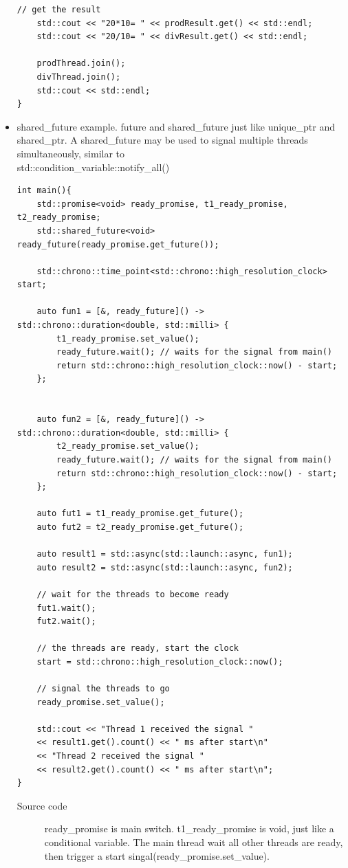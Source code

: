 \documentclass[a4paper,11pt,twoside]{book}
\begin{document}
\begin{itemize}
\begin{lstlisting}[numbers=none]
	// get the result
	std::cout << "20*10= " << prodResult.get() << std::endl;
	std::cout << "20/10= " << divResult.get() << std::endl;
	
	prodThread.join();	
	divThread.join();
	std::cout << std::endl;	
}	
\end{lstlisting}

\item shared\_future example. future and shared\_future just like unique\_ptr and shared\_ptr. A shared\_future may be used to signal multiple threads simultaneously, similar to \\
std::condition\_variable::notify\_all()

\begin{lstlisting}[numbers=none]
int main(){   
	std::promise<void> ready_promise, t1_ready_promise, t2_ready_promise;
	std::shared_future<void> ready_future(ready_promise.get_future());
	
	std::chrono::time_point<std::chrono::high_resolution_clock> start;
	
	auto fun1 = [&, ready_future]() -> std::chrono::duration<double, std::milli> {
		t1_ready_promise.set_value();
		ready_future.wait(); // waits for the signal from main()
		return std::chrono::high_resolution_clock::now() - start;
	};
	
	
	auto fun2 = [&, ready_future]() -> std::chrono::duration<double, std::milli> {
		t2_ready_promise.set_value();
		ready_future.wait(); // waits for the signal from main()
		return std::chrono::high_resolution_clock::now() - start;
	};
	
	auto fut1 = t1_ready_promise.get_future();
	auto fut2 = t2_ready_promise.get_future();
	
	auto result1 = std::async(std::launch::async, fun1);
	auto result2 = std::async(std::launch::async, fun2);
	
	// wait for the threads to become ready
	fut1.wait();
	fut2.wait();
	
	// the threads are ready, start the clock
	start = std::chrono::high_resolution_clock::now();
	
	// signal the threads to go
	ready_promise.set_value();
	
	std::cout << "Thread 1 received the signal "
	<< result1.get().count() << " ms after start\n"
	<< "Thread 2 received the signal "
	<< result2.get().count() << " ms after start\n";
}
\end{lstlisting}
\begin{description}
	\item[Source code] ready\_promise is main switch. t1\_ready\_promise is void, just like a conditional variable.
	The main thread wait all other threads are ready, then trigger a start singal(ready\_promise.set\_value).
\end{description}


\end{itemize}
\end{document}
